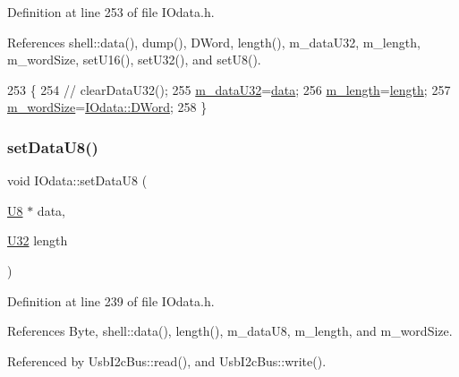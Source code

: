 Definition at line 253 of file I\+Odata.\+h.



References shell\+::data(), dump(), D\+Word, length(), m\+\_\+data\+U32, m\+\_\+length, m\+\_\+word\+Size, set\+U16(), set\+U32(), and set\+U8().


\begin{DoxyCode}
253                                         \{
254 \textcolor{comment}{//    clearDataU32();}
255     \hyperlink{classIOdata_a247cdaefd87084e3cad1d530d592d99a}{m\_dataU32}=\hyperlink{namespaceshell_a5ea2525995cedc3efd69ea8a7f034d1e}{data};
256     \hyperlink{classIOdata_afabe57441da019eb614d277799106aac}{m\_length}=\hyperlink{classIOdata_abb40e71ce0290832a24857b4a1e7b1a3}{length};
257     \hyperlink{classIOdata_a719b0ce607ada4fa91b12d6ecfa1b4c9}{m\_wordSize}=\hyperlink{classIOdata_a37c53ebf4bf8d866aac8af572962a84ca458da82d97e3ea9715c34b558c34f734}{IOdata::DWord};
258   \}
\end{DoxyCode}
\mbox{\label{classIOdata_afece89b7035f6eec001cd397f07c062d}} 
\subsubsection{\texorpdfstring{set\+Data\+U8()}{setDataU8()}}
{\footnotesize\ttfamily void I\+Odata\+::set\+Data\+U8 (\begin{DoxyParamCaption}\item[{\hyperlink{classIOdata_a18d1354b7cdaf0f8a8001fdbb3ced418}{U8} $\ast$}]{data,  }\item[{\hyperlink{classIOdata_a96fb57f5fcd87b708743abd3c86a5198}{U32}}]{length }\end{DoxyParamCaption})\hspace{0.3cm}{\ttfamily [inline]}}



Definition at line 239 of file I\+Odata.\+h.



References Byte, shell\+::data(), length(), m\+\_\+data\+U8, m\+\_\+length, and m\+\_\+word\+Size.



Referenced by Usb\+I2c\+Bus\+::read(), and Usb\+I2c\+Bus\+::write().


